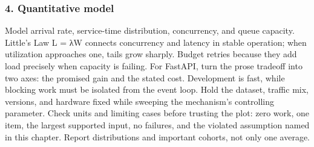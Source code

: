 \subsubsection*{4. Quantitative model}
Model arrival rate, service-time distribution, concurrency, and queue capacity. Little's Law L = λW connects concurrency and latency in stable operation; when utilization approaches one, tails grow sharply. Budget retries because they add load precisely when capacity is failing.
For FastAPI, turn the prose tradeoff into two axes: the promised gain and the stated cost. Development is fast, while blocking work must be isolated from the event loop. Hold the dataset, traffic mix, versions, and hardware fixed while sweeping the mechanism's controlling parameter.
Check units and limiting cases before trusting the plot: zero work, one item, the largest supported input, no failures, and the violated assumption named in this chapter. Report distributions and important cohorts, not only one average.
